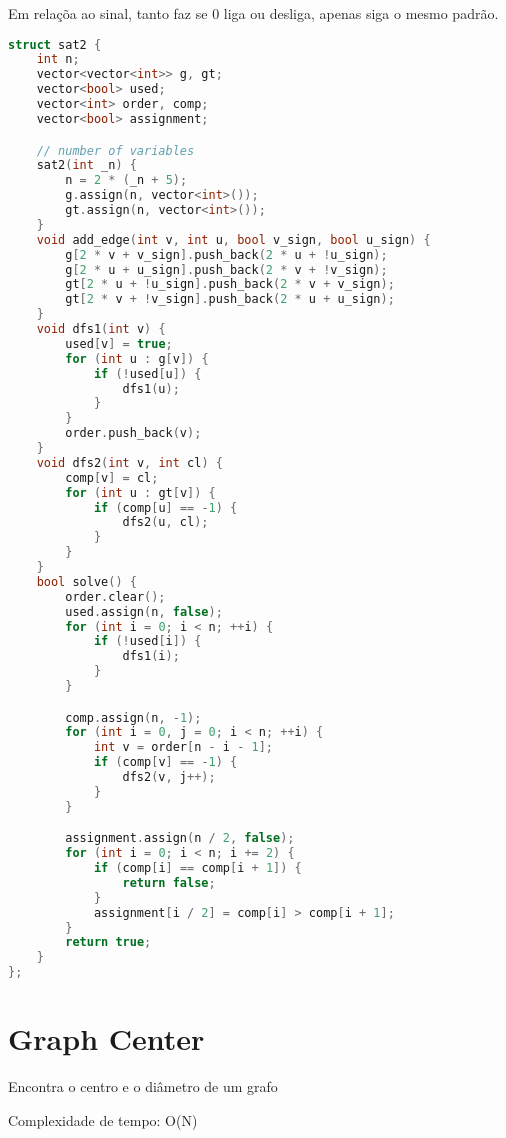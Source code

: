 \documentclass[11pt, a4paper, oneside]{book}
\begin{document}
Em relaçõa ao sinal, tanto faz se 0 liga ou desliga, apenas siga o mesmo padrão.

\hfill

\begin{multicols}{2}
\begin{lstlisting}[language=C++]
struct sat2 {
    int n;
    vector<vector<int>> g, gt;
    vector<bool> used;
    vector<int> order, comp;
    vector<bool> assignment;

    // number of variables
    sat2(int _n) {
        n = 2 * (_n + 5);
        g.assign(n, vector<int>());
        gt.assign(n, vector<int>());
    }
    void add_edge(int v, int u, bool v_sign, bool u_sign) {
        g[2 * v + v_sign].push_back(2 * u + !u_sign);
        g[2 * u + u_sign].push_back(2 * v + !v_sign);
        gt[2 * u + !u_sign].push_back(2 * v + v_sign);
        gt[2 * v + !v_sign].push_back(2 * u + u_sign);
    }
    void dfs1(int v) {
        used[v] = true;
        for (int u : g[v]) {
            if (!used[u]) {
                dfs1(u);
            }
        }
        order.push_back(v);
    }
    void dfs2(int v, int cl) {
        comp[v] = cl;
        for (int u : gt[v]) {
            if (comp[u] == -1) {
                dfs2(u, cl);
            }
        }
    }
    bool solve() {
        order.clear();
        used.assign(n, false);
        for (int i = 0; i < n; ++i) {
            if (!used[i]) {
                dfs1(i);
            }
        }

        comp.assign(n, -1);
        for (int i = 0, j = 0; i < n; ++i) {
            int v = order[n - i - 1];
            if (comp[v] == -1) {
                dfs2(v, j++);
            }
        }

        assignment.assign(n / 2, false);
        for (int i = 0; i < n; i += 2) {
            if (comp[i] == comp[i + 1]) {
                return false;
            }
            assignment[i / 2] = comp[i] > comp[i + 1];
        }
        return true;
    }
};
\end{lstlisting}
\end{multicols}

\hfill

\section{Graph Center}


Encontra o centro e o diâmetro de um grafo



Complexidade de tempo: O(N)
\end{document}
